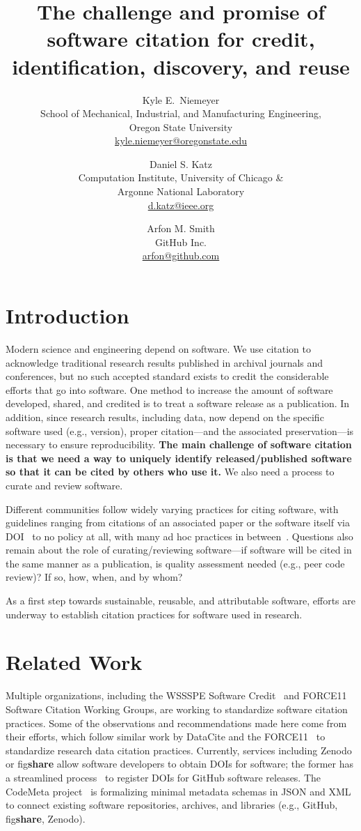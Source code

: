 \documentclass[letterpaper,10pt]{article}
\title{The challenge and promise of software citation for credit, identification, discovery, and reuse}
\author{
Kyle E.\ Niemeyer\\
School of Mechanical, Industrial, and Manufacturing Engineering,\\
Oregon State University\\
\href{mailto:kyle.niemeyer@oregonstate.edu}{kyle.niemeyer@oregonstate.edu}
\and
Daniel S. Katz\\
Computation Institute, University of Chicago \&\\
Argonne National Laboratory\\
\href{mailto:d.katz@ieee.org}{d.katz@ieee.org}
\and
Arfon M. Smith\\
GitHub Inc.\\
\href{mailto:arfon@github.com}{arfon@github.com}
}
\date{}
\begin{document}
\maketitle

\section{Introduction}

Modern science and engineering depend on software.
We use citation to acknowledge traditional research results published in archival journals and conferences, but no such accepted standard exists to credit the considerable efforts that go into software.
One method to increase the amount of software developed, shared, and credited is to treat a software release as a publication. 
In addition, since research results, including data, now depend on the specific software used (e.g., version), proper citation---and the associated preservation---is necessary to ensure reproducibility.
\textbf{The main challenge of software citation is that we need a way to uniquely identify released\slash published software so that it can be cited by others who use it.}
We also need a process to curate and review software.

Different communities follow widely varying practices for citing software, with guidelines ranging from citations of an associated paper or the software itself via DOI~\citep{AAS:2016} to no policy at all, with many ad hoc practices in between~\citep{Howison2015}.
Questions also remain about the role of curating\slash reviewing software---if software will be cited in the same manner as a publication, is quality assessment needed (e.g., peer code review)?
If so, how, when, and by whom?

As a first step towards sustainable, reusable, and attributable software, efforts are underway to establish citation practices for software used in research.

\section{Related Work}

Multiple organizations, including the WSSSPE Software Credit~\citep{WSSSPE1,WSSSPE2,WSSSPE3} and FORCE11 Software Citation Working Groups, are working to standardize software citation practices.
Some of the observations and recommendations made here come from their efforts, which follow similar work by DataCite and the FORCE11~\citet{DataCitation2014} to standardize research data citation practices.
Currently, services including Zenodo or fig\textbf{share} allow software developers to obtain DOIs for software; the former has a streamlined process~\citep{GitHubZenodo} to register DOIs for GitHub software releases.
The CodeMeta project~\citep{CodeMeta} is formalizing minimal metadata schemas in JSON and XML to connect existing software repositories, archives, and libraries (e.g., GitHub, fig\textbf{share}, Zenodo).
\end{document}
